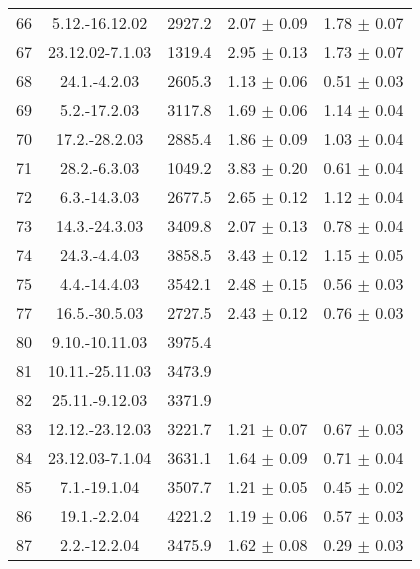 \documentclass[a4paper,12pt]{article}
\begin{document}
\begin{center}
\begin{longtable}{|c|c|c|c|c|}
    66  &       5.12.-16.12.02  &       2927.2  &       2.07 $\pm$ 0.09 &       1.78 $\pm$ 0.07 \\
    67  &       23.12.02-7.1.03 &       1319.4  &       2.95 $\pm$ 0.13 &       1.73 $\pm$ 0.07 \\
    68  &       24.1.-4.2.03    &       2605.3  &       1.13 $\pm$ 0.06 &       0.51 $\pm$ 0.03 \\
    69  &       5.2.-17.2.03    &       3117.8  &       1.69 $\pm$ 0.06 &       1.14 $\pm$ 0.04 \\
    70  &       17.2.-28.2.03   &       2885.4  &       1.86 $\pm$ 0.09 &       1.03 $\pm$ 0.04 \\
    71  &       28.2.-6.3.03    &       1049.2  &       3.83 $\pm$ 0.20 &       0.61 $\pm$ 0.04 \\
    72  &       6.3.-14.3.03    &       2677.5  &       2.65 $\pm$ 0.12 &       1.12 $\pm$ 0.04 \\
    73  &       14.3.-24.3.03   &       3409.8  &       2.07 $\pm$ 0.13 &       0.78 $\pm$ 0.04 \\
    74  &       24.3.-4.4.03    &       3858.5  &       3.43 $\pm$ 0.12 &       1.15 $\pm$ 0.05 \\
    75  &       4.4.-14.4.03    &       3542.1  &       2.48 $\pm$ 0.15 &       0.56 $\pm$ 0.03 \\
    77  &       16.5.-30.5.03   &       2727.5  &       2.43 $\pm$ 0.12 &       0.76 $\pm$ 0.03 \\
    80  &       9.10.-10.11.03  &       3975.4  &                       &                       \\
    81  &       10.11.-25.11.03 &       3473.9  &                       &                       \\
    82  &       25.11.-9.12.03  &       3371.9  &                       &                       \\
    83  &       12.12.-23.12.03 &       3221.7  &       1.21 $\pm$ 0.07 &       0.67 $\pm$ 0.03 \\
    84  &       23.12.03-7.1.04 &       3631.1  &       1.64 $\pm$ 0.09 &       0.71 $\pm$ 0.04 \\
    85  &       7.1.-19.1.04    &       3507.7  &       1.21 $\pm$ 0.05 &       0.45 $\pm$ 0.02 \\
    86  &       19.1.-2.2.04    &       4221.2  &       1.19 $\pm$ 0.06 &       0.57 $\pm$ 0.03 \\
    87  &       2.2.-12.2.04    &       3475.9  &       1.62 $\pm$ 0.08 &       0.29 $\pm$ 0.03 \\

\end{longtable}
\end{center}
\end{document}
